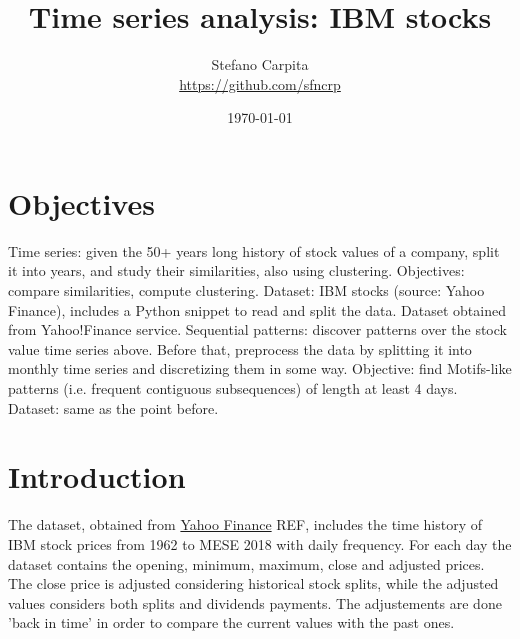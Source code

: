 \documentclass[a4paper,11pt,final]{article}
\title{Time series analysis: IBM stocks}
\author{Stefano Carpita \\ \url{https://github.com/sfncrp}}
\date{\today}
\begin{document}
\maketitle

\section{Objectives}

Time series: given the 50+ years long history of stock values of a company, split it into years, and study their similarities, also using clustering. Objectives: compare similarities, compute clustering. Dataset: IBM stocks (source: Yahoo Finance), includes a Python snippet to read and split the data. Dataset obtained from Yahoo!Finance service.
Sequential patterns: discover patterns over the stock value time series above. Before that, preprocess the data by splitting it into monthly time series and discretizing them in some way. Objective: find Motifs-like patterns (i.e. frequent contiguous subsequences) of length at least 4 days. Dataset: same as the point before.

\section{Introduction}

The dataset, obtained from \href{https://finance.yahoo.com/quote/IBM/history?period1=-252378000&period2=1523656800&interval=1d&filter=history&frequency=1d&guccounter=1}{Yahoo Finance} REF, includes the time history of IBM stock prices from 1962 to MESE 2018 with daily frequency.
For each day the dataset contains the opening, minimum, maximum, close and adjusted prices.
The close price is adjusted considering historical stock splits, while the adjusted values considers both splits and dividends payments.
The adjustements are done 'back in time' in order to compare the current values with the past ones.
\end{document}
